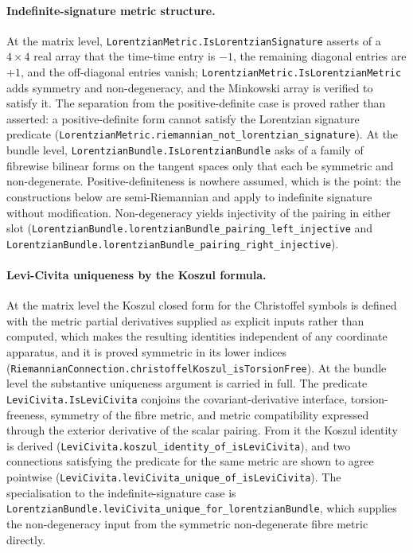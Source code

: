 \documentclass[aps,prd,nofootinbib,superscriptaddress,12pt]{revtex4-2}
\DeclareRobustCommand{\lb}{\discretionary{}{}{}}
\begin{document}
\paragraph{Indefinite-signature metric structure.}
At the matrix level, \texttt{Lorentzian\lb{}Metric.\lb{}Is\lb{}Lorentzian\lb{}Signature} asserts of a
$4 \times 4$ real array that the time-time entry is $-1$, the remaining diagonal
entries are $+1$, and the off-diagonal entries vanish;
\texttt{Lorentzian\lb{}Metric.\lb{}Is\lb{}Lorentzian\lb{}Metric} adds symmetry and non-degeneracy, and
the Minkowski array is verified to satisfy it. The separation from the
positive-definite case is proved rather than asserted: a positive-definite form
cannot satisfy the Lorentzian signature predicate
(\texttt{Lorentzian\lb{}Metric.\lb{}riemannian\_\lb{}not\_\lb{}lorentzian\_\lb{}signature}). At the bundle
level, \texttt{Lorentzian\lb{}Bundle.\lb{}Is\lb{}Lorentzian\lb{}Bundle} asks of a family of fibrewise
bilinear forms on the tangent spaces only that each be symmetric and
non-degenerate. Positive-definiteness is nowhere assumed, which is the point:
the constructions below are semi-Riemannian and apply to indefinite signature
without modification. Non-degeneracy yields injectivity of the pairing in either
slot (\texttt{Lorentzian\lb{}Bundle.\lb{}lorentzian\lb{}Bundle\_\lb{}pairing\_\lb{}left\_\lb{}injective} and
\texttt{Lorentzian\lb{}Bundle.\lb{}lorentzian\lb{}Bundle\_\lb{}pairing\_\lb{}right\_\lb{}injective}).

\paragraph{Levi-Civita uniqueness by the Koszul formula.}
At the matrix level the Koszul closed form for the Christoffel symbols is
defined with the metric partial derivatives supplied as explicit inputs rather
than computed, which makes the resulting identities independent of any coordinate
apparatus, and it is proved symmetric in its lower indices
(\texttt{Riemannian\lb{}Connection.\lb{}christoffel\lb{}Koszul\_\lb{}is\lb{}Torsion\lb{}Free}). At the bundle
level the substantive uniqueness argument is carried in full. The predicate
\texttt{Levi\lb{}Civita.\lb{}Is\lb{}Levi\lb{}Civita} conjoins the covariant-derivative interface,
torsion-freeness, symmetry of the fibre metric, and metric compatibility
expressed through the exterior derivative of the scalar pairing. From it the
Koszul identity is derived
(\texttt{Levi\lb{}Civita.\lb{}koszul\_\lb{}identity\_\lb{}of\_\lb{}is\lb{}Levi\lb{}Civita}), and two connections
satisfying the predicate for the same metric are shown to agree pointwise
(\texttt{Levi\lb{}Civita.\lb{}levi\lb{}Civita\_\lb{}unique\_\lb{}of\_\lb{}is\lb{}Levi\lb{}Civita}). The specialisation to
the indefinite-signature case is
\texttt{Lorentzian\lb{}Bundle.\lb{}levi\lb{}Civita\_\lb{}unique\_\lb{}for\_\lb{}lorentzian\lb{}Bundle}, which supplies
the non-degeneracy input from the symmetric non-degenerate fibre metric directly.
\end{document}
